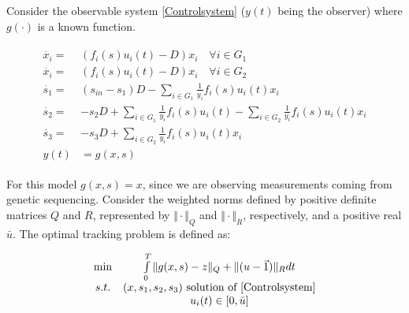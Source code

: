 \documentclass[3p,times]{elsarticle}
\begin{document}
Consider the observable system \eqref{Controlsystem} ($y(t)$ being the observer) where $g(\cdot)$ is a known function.

\begin{align} 
\label{Controlsystem}
\begin{array}{cl}
\dot{x_i} =& \left(f_i(s)u_i(t) -D \right)x_i \quad \forall i \in G_1\\
\dot{x_i} =& \left(f_i(s)u_i(t) -D \right)x_i \quad \forall i \in G_2\\
\dot{s_1} =& \displaystyle (s_{in}-s_1)D-\sum\limits_{i \in G_1}\frac{1}{y_i}f_i(s)u_i(t) x_i  \\
\dot{s_2} = & \displaystyle -s_2D+\sum\limits_{i \in G_1}\frac{1}{y_i}f_i(s)u_i(t)	-\sum\limits_{i \in G_2}\frac{1}{y_i}f_i(s)u_i(t) x_i  \\
\dot{s_3} =&  \displaystyle -s_3D+\sum\limits_{i \in G_2}\frac{1}{y_i}f_i(s)u_i(t) x_i \\
y(t) & = g(x,s)
\end{array}
\end{align}	

For this model $g(x,s) = x$, since we are observing measurements coming from genetic sequencing. Consider the weighted norms defined by positive definite matrices $Q$ and $R$, represented by $\Vert \cdot \Vert_Q$ and $\Vert \cdot \Vert_R$, respectively, and a positive real $\bar{u}$. The optimal tracking problem is defined as: 

\begin{align}
\label{Optimal Control} \begin{array}{cc} \min &  \int \limits_{0}^{T} \Vert g(x,s) - z \Vert_Q + \Vert(u -\vec{1}) \Vert_R dt\\
s.t.& 
(x,s_1,s_2,s_3)\mbox{ solution of \eqref{Controlsystem}} \\
&u_i(t) \in [0,\bar{u}]
\end{array}	
\end{align} 
\end{document}

